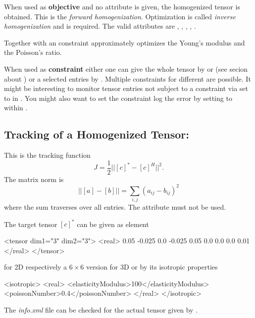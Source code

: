 When used as \textbf{objective} and no  attribute is given, the homogenized tensor is obtained. This is the \textit{forward homogenization}. Optimization is called \textit{inverse homogenization} and  is required. The valid attributes are , , , , . 

Together with an  constraint  approximately optimizes the Young's modulus and  the Poisson's ratio.  

When used as \textbf{constraint} either one can give the whole tensor by  or  (see secion about  ) or a selected entries by . Multiple constraints for different  are possible. It might be interesting to monitor tensor entries not subject to a constraint via  set to  in . You might also want to set the constraint log the error by setting  to  within . 


\subsection{Tracking of a Homogenized Tensor: }

This is the tracking function 
\begin{equation}
 J = \frac{1}{2} || [c]^*-[c]^H||^2.
\end{equation}
The matrix norm is 
\begin{equation}
|| [a] - [b] || = \sum_{i,j} (a_{ij} - b_{ij})^2
\end{equation}
where the sum traverses over all entries. The  attribute must not be used.

The target tensor $[c]^*$ can be given as  element 
\begin{xmllisting}
<tensor dim1="3" dim2="3">
  <real>
    0.05  -0.025  0.0
   -0.025  0.05   0.0
    0.0    0.0    0.01
  </real>
</tensor>      
\end{xmllisting}
for 2D respectively a $6 \times 6$ version for 3D or by its isotropic properties
\begin{xmllisting}
<isotropic>
  <real>
    <elasticityModulus>100</elasticityModulus>
    <poissonNumber>0.4</poissonNumber>
  </real>
</isotropic>
\end{xmllisting}
The \textit{info.xml} file can be checked for the actual tensor given by .



